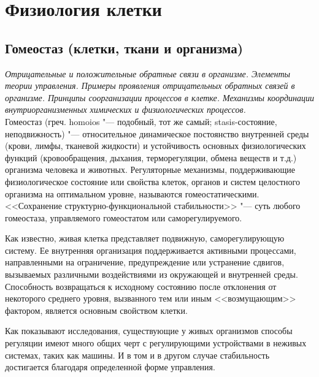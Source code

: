\documentclass[12pt,a4paper,oneside]{book}
\begin{document}




\chapter{Физиология клетки}
\section{Гомеостаз (клетки, ткани и организма)}

{\it Отрицательные и положительные обратные связи в организме. Элементы теории управления. Примеры проявления отрицательных обратных связей в организме. Принципы соорганизации процессов в клетке. Механизмы координации внутриорганизменных химических и физиологических процессов.}\\


Гомеостаз (греч. homoios "--- подобный, тот же самый; stasis-состояние, неподвижность) "--- относительное динамическое постоянство внутренней среды (крови, лимфы, тканевой жидкости) и устойчивость основных физиологических функций (кровообращения, дыхания, терморегуляции, обмена веществ и т.д.) организма человека и животных. Регуляторные механизмы, поддерживающие физиологическое состояние или свойства клеток, органов и систем целостного организма на оптимальном уровне, называются гомеостатическими. <<Сохранение структурно-функциональной стабильности>> "--- суть любого гомеостаза, управляемого гомеостатом или саморегулируемого.

Как известно, живая клетка представляет подвижную, саморегулирующую систему. Ее внутренняя организация поддерживается активными процессами, направленными на ограничение, предупреждение или устранение сдвигов, вызываемых различными воздействиями из окружающей и внутренней среды. Способность возвращаться к исходному состоянию после отклонения от некоторого среднего уровня, вызванного тем или иным <<возмущающим>> фактором, является основным свойством клетки.

Как показывают исследования, существующие у живых организмов способы регуляции имеют много общих черт с регулирующими устройствами в неживых системах, таких как машины. И в том и в другом случае стабильность достигается благодаря определенной форме управления.
\end{document}
